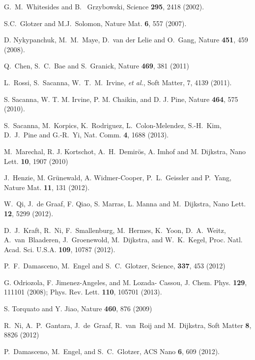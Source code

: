 \documentclass[10pt,onside,singlecolumn]{article}
\begin{document}
\footnotesize{
\begin{thebibliography}{99}

G.~M.~Whitesides and B.~ Grzybowski, Science {\bf295}, 2418 (2002).

S.C.~Glotzer and M.J.~Solomon, Nature Mat. {\bf 6}, 557 (2007).

D. Nykypanchuk, M.~M.~Maye, D.~van der Lelie and O.~Gang, Nature {\bf 451}, 459 (2008).

Q.~Chen, S.~C.~Bae and S.~Granick, Nature {\bf469}, 381 (2011)

L.~Rossi, S.~Sacanna, W.~T.~M.~Irvine, \emph{et al.}, Soft Matter, 7, 4139 (2011).

S. Sacanna, W. T. M. Irvine, P. M. Chaikin, and D. J.
Pine, Nature {\bf 464}, 575 (2010).

S.~Sacanna, M.~Korpics, K.~Rodriguez, L.~Colon-Melendez, S.-H.~Kim, D.~J.~Pine and G.-R.~Yi, Nat. Comm. {\bf 4}, 1688 (2013).

M.~Marechal, R. J. Kortschot, A.~H.~Demir\"os, A. Imhof and M. Dijkstra, Nano Lett. {\bf 10}, 1907 (2010)

J.~Henzie, M. Gr\"unewald, A. Widmer-Cooper, P.~L.~Geissler and P.~Yang, Nature Mat. {\bf 11}, 131 (2012).

W.~Qi, J.~de Graaf, F. Qiao, S. Marras, L. Manna and M.~Dijkstra, Nano Lett. {\bf 12}, 5299 (2012).

D.~J.~Kraft, R.~Ni, F.~Smallenburg, M.~Hermes, K.~Yoon, D.~A.~Weitz, A.~van~Blaaderen, J.~Groenewold, M.~Dijkstra, and W.~K.~Kegel,  Proc. Natl. Acad. Sci. U.S.A. {\bf 109}, 10787 (2012).

P.~F.~Damasceno, M.~Engel and S.~C.~Glotzer, Science, {\bf 337}, 453 (2012)

G. Odriozola, F. Jimenez-Angeles, and M. Lozada-
Cassou, J. Chem. Phys. {\bf 129}, 111101 (2008); Phys. Rev. Lett. {\bf 110}, 105701 (2013).

S. Torquato and Y. Jiao, Nature {\bf460}, 876 (2009)

R.~Ni, A.~P.~Gantara, J.~de~Graaf, R.~van~Roij and M.~Dijkstra, Soft Matter {\bf 8}, 8826 (2012)

P.~Damasceno, M.~Engel, and S.~C.~Glotzer, ACS Nano {\bf 6}, 609 (2012). 


\end{thebibliography}}
\end{document}
